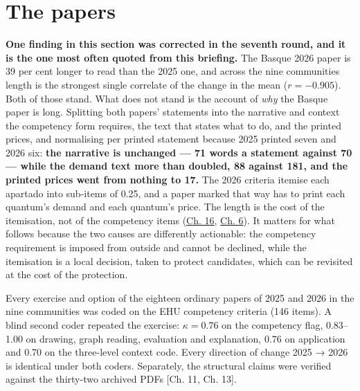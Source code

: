 \documentclass[
  10.5pt,
  a4paper,
  DIV=11,
  numbers=noendperiod]{scrartcl}
\begin{document}
\section{The papers}\label{the-papers}

\textbf{One finding in this section was corrected in the seventh round,
and it is the one most often quoted from this briefing.} The Basque 2026
paper is 39 per cent longer to read than the 2025 one, and across the
nine communities length is the strongest single correlate of the change
in the mean (\(r = -0.905\)). Both of those stand. What does not stand
is the account of \emph{why} the Basque paper is long. Splitting both
papers' statements into the narrative and context the competency form
requires, the text that states what to do, and the printed prices, and
normalising per printed statement because 2025 printed seven and 2026
six: \textbf{the narrative is unchanged --- 71 words a statement against
70 --- while the demand text more than doubled, 88 against 181, and the
printed prices went from nothing to 17.} The 2026 criteria itemise each
apartado into sub-items of 0.25, and a paper marked that way has to
print each quantum's demand and each quantum's price. The length is the
cost of the itemisation, not of the competency items
(\href{16-paradigm.qmd}{Ch. 16},
\href{06-interpretation.qmd\#exposure-and-the-third-channel}{Ch. 6}). It
matters for what follows because the two causes are differently
actionable: the competency requirement is imposed from outside and
cannot be declined, while the itemisation is a local decision, taken to
protect candidates, which can be revisited at the cost of the
protection.

Every exercise and option of the eighteen ordinary papers of 2025 and
2026 in the nine communities was coded on the EHU competency criteria
(146 items). A blind second coder repeated the exercise:
\(\kappa = 0.76\) on the competency flag, 0.83--1.00 on drawing, graph
reading, evaluation and explanation, 0.76 on application and 0.70 on the
three-level context code. Every direction of change 2025 → 2026 is
identical under both coders. Separately, the structural claims were
verified against the thirty-two archived PDFs {[}Ch. 11, Ch. 13{]}.
\end{document}
